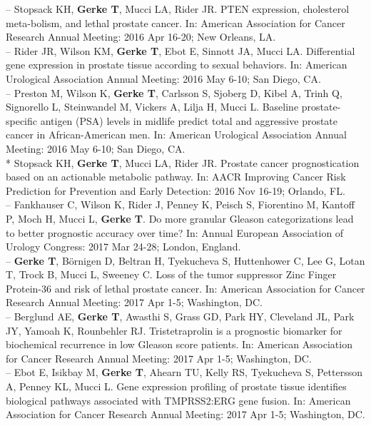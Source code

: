 \documentclass[11pt, a4paper]{article} %
\begin{document}
-- Stopsack KH, {\bf Gerke T}, Mucci LA, Rider JR. PTEN expression, cholesterol meta-bolism, and lethal prostate cancer. In: American Association for Cancer Research Annual Meeting: 2016 Apr 16-20; New Orleans, LA.\\

-- Rider JR, Wilson KM, {\bf Gerke T}, Ebot E, Sinnott JA, Mucci LA. Differential gene expression in prostate tissue according to sexual behaviors. In: American Urological Association Annual Meeting: 2016 May 6-10; San Diego, CA.\\

-- Preston M, Wilson K, {\bf Gerke T}, Carlsson S, Sjoberg D, Kibel A, Trinh Q, Signorello L, Steinwandel M, Vickers A, Lilja H, Mucci L. Baseline prostate-specific antigen (PSA) levels in midlife predict total and aggressive prostate cancer in African-American men. In: American Urological Association Annual Meeting: 2016 May 6-10; San Diego, CA.\\

* Stopsack KH, {\bf Gerke T}, Mucci LA, Rider JR. Prostate cancer prognostication based on an actionable metabolic pathway. In: AACR Improving Cancer Risk Prediction for Prevention and Early Detection: 2016 Nov 16-19; Orlando, FL.\\

-- Fankhauser C, Wilson K, Rider J, Penney K, Peisch S, Fiorentino M, Kantoff P, Moch H, Mucci L, {\bf Gerke T}. Do more granular Gleason categorizations lead to better prognostic accuracy over time? In: Annual European Association of Urology Congress: 2017 Mar 24-28; London, England.\\

-- {\bf Gerke T},  B\"{o}rnigen D, Beltran H, Tyekucheva S, Huttenhower C, Lee G, Lotan T, Trock B, Mucci L, Sweeney C. Loss of the tumor suppressor Zinc Finger Protein-36 and risk of lethal prostate cancer. In: American Association for Cancer Research Annual Meeting: 2017 Apr 1-5; Washington, DC.\\

-- Berglund AE, {\bf Gerke T}, Awasthi S, Grass GD, Park HY, Cleveland JL, Park JY, Yamoah K, Rounbehler RJ. Tristetraprolin is a prognostic biomarker for biochemical recurrence in low Gleason score patients. In: American Association for Cancer Research Annual Meeting: 2017 Apr 1-5; Washington, DC.\\

-- Ebot E, Isikbay M, {\bf Gerke T}, Ahearn TU, Kelly RS, Tyekucheva S, Pettersson A, Penney KL, Mucci L. Gene expression profiling of prostate tissue identifies biological pathways associated with TMPRSS2:ERG gene fusion. In: American Association for Cancer Research Annual Meeting: 2017 Apr 1-5; Washington, DC.\\
\end{document}
